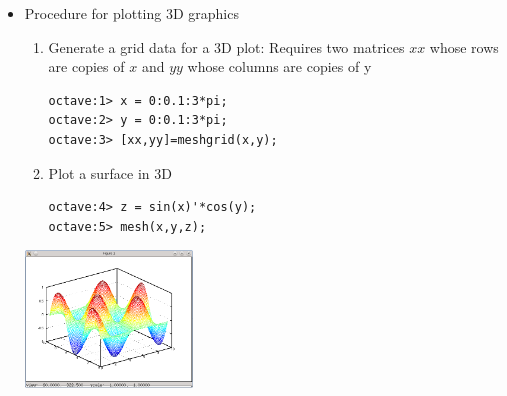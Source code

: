 \documentclass[slidestop,mathserif,compress,xcolor=svgnames]{beamer}
\begin{document}
\begin{frame}
\begin{itemize}
\begin{center}
    \end{center}
    \framebreak
    \item Procedure for plotting 3D graphics
    \begin{enumerate}
      \item Generate a grid data for a 3D plot: Requires two matrices $xx$ whose rows are copies of $x$ and $yy$ whose columns are copies of y
      \begin{verbatim}
octave:1> x = 0:0.1:3*pi;
octave:2> y = 0:0.1:3*pi;
octave:3> [xx,yy]=meshgrid(x,y);
      \end{verbatim}
    \item Plot a surface in 3D
      \begin{verbatim}
octave:4> z = sin(x)'*cos(y);
octave:5> mesh(x,y,z);
      \end{verbatim}
    \end{enumerate}
    \begin{center}
      \includegraphics[width=0.35\textwidth]{./octave-plot-3d}
    \end{center}
  \end{itemize}
\end{frame}
\end{document}
